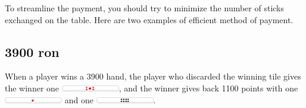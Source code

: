 \bigskip
To streamline the payment, you should try to minimize the number of sticks exchanged on the table. Here are two examples of efficient method of payment. 

\subsection*{3900 {\jap ron}}
When a player wins a 3900 hand, the player who discarded the winning tile gives the winner one \includegraphics[width=1in]{figs/tenbou5000}, and the winner gives  back 1100 points with one \includegraphics[width=1in]{figs/tenbou1000} and one \includegraphics[width=1in]{figs/tenbou100}. 

